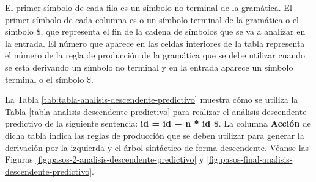 El primer símbolo de cada fila es un símbolo no terminal de la gramática. El primer símbolo de cada columna es o un símbolo terminal de la gramática o el símbolo \$, que representa el fin de la cadena de símbolos que se va a analizar en la entrada. El número que aparece en las celdas interiores de la tabla representa el número de la regla de producción de la gramática que se debe utilizar cuando se está derivando un símbolo no terminal y en la entrada aparece un símbolo terminal o el símbolo \$.

La Tabla \ref{tab:tabla-analisis-descendente-predictivo} muestra cómo se utiliza la Tabla \ref{tabla-analisis-descendente-predictivo} para realizar  el análisis descendente predictivo de la siguiente sentencia:  \textbf{id = id + n * id \$}. La columna \textbf{Acción} de dicha tabla indica las reglas de producción que se deben utilizar para generar la derivación por la izquierda y el árbol sintáctico de forma descendente. Véanse las Figuras \ref{fig:pasos-2-analisis-descendente-predictivo} y \ref{fig:pasos-final-analisis-descendente-predictivo}.

